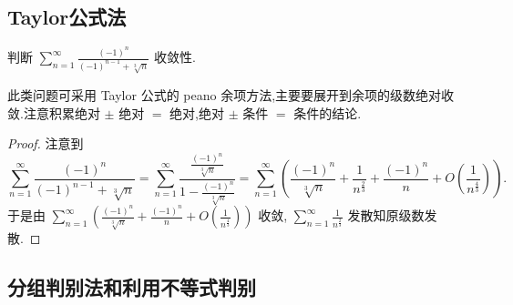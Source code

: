 \documentclass[../../main.tex]{subfiles}%
\begin{document}
\subsection{Taylor公式法}

\begin{example}
判断 $\sum_{n=1}^{\infty} \frac{(-1)^n}{(-1)^{n - 1} + \sqrt[3]{n}}$ 收敛性.
\end{example}
\begin{note}
此类问题可采用 Taylor 公式的 peano 余项方法,主要要展开到余项的级数绝对收敛.注意积累绝对 $\pm$ 绝对 $=$ 绝对,绝对 $\pm$ 条件 $=$ 条件的结论.
\end{note}
\begin{proof}

注意到
\[
\sum_{n=1}^{\infty} \frac{(-1)^n}{(-1)^{n - 1} + \sqrt[3]{n}} = \sum_{n=1}^{\infty} \frac{\frac{(-1)^n}{\sqrt[3]{n}}}{1 - \frac{(-1)^n}{\sqrt[3]{n}}} = \sum_{n=1}^{\infty} \left( \frac{(-1)^n}{\sqrt[3]{n}} + \frac{1}{n^{\frac{2}{3}}} + \frac{(-1)^n}{n} + O \left( \frac{1}{n^{\frac{4}{3}}} \right) \right).
\]
于是由 $\sum_{n=1}^{\infty} \left( \frac{(-1)^n}{\sqrt[3]{n}} + \frac{(-1)^n}{n} + O \left( \frac{1}{n^{\frac{4}{3}}} \right) \right)$ 收敛, $\sum_{n=1}^{\infty} \frac{1}{n^{\frac{2}{3}}}$ 发散知原级数发散.

\end{proof}



\subsection{分组判别法和利用不等式判别}
\end{document}
